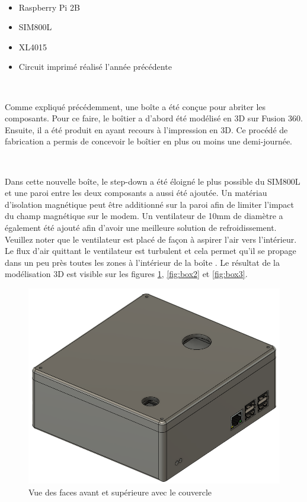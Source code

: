 ~

\begin{itemize}
  \item Raspberry Pi 2B
  \item SIM800L
  \item XL4015
  \item Circuit imprimé réalisé l'année précédente
\end{itemize}

~

\noindent
 Comme expliqué précédemment, une boîte a été conçue pour abriter les composants. Pour ce faire, le boîtier a d'abord été modélisé en 3D sur Fusion 360. Ensuite, il a été produit en ayant recours à l'impression en 3D. Ce procédé de fabrication a permis de concevoir le boîtier en plus ou moins une demi-journée.

 ~

 \noindent
Dans cette nouvelle boîte, le step-down a été éloigné le plus possible du SIM800L et une paroi entre les deux composants a aussi été ajoutée. Un matériau d'isolation magnétique peut être additionné sur la paroi afin de limiter l'impact du champ magnétique sur le modem. Un ventilateur de 10mm de diamètre a également été ajouté afin d'avoir une meilleure solution de refroidissement. Veuillez noter que le ventilateur est placé de façon à aspirer l'air vers l'intérieur. Le flux d'air quittant le ventilateur est turbulent et cela permet qu'il se propage dans un peu près toutes les zones à l'intérieur de la boîte \cite{cooling}. Le résultat de la modélisation 3D est visible sur les figures \ref{fig:box1}, \ref{fig:box2} et \ref{fig:box3}.



\begin{figure}[ht!]
  \centering
  \includegraphics[scale=0.4]{img/el_prototype/box1}
  \caption{Vue des faces avant et supérieure avec le couvercle}
  \label{fig:box1}
\end{figure}


